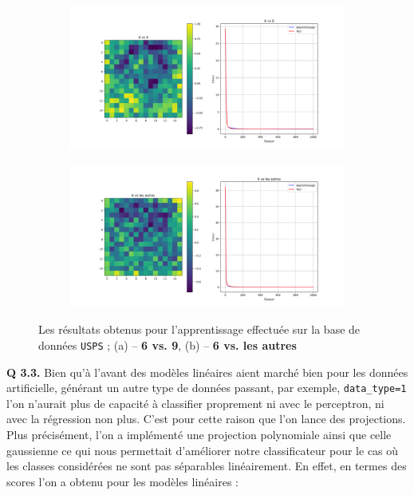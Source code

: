 \documentclass[a4paper,11pt]{article}
\theoremstyle{plain}
\theoremstyle{definition}
\begin{document}
\begin{figure}
    \centering
    \begin{subfigure}{1.0\textwidth}
    	\centering
    	\includegraphics{Figures/Figure_7.png}
    	\caption{}
    	\label{ResUSPS6vs9}
    \end{subfigure}

    \begin{subfigure}{1.0\textwidth}
    	\centering
    	\includegraphics{Figures/Figure_8.png}
    	\caption{}
    	\label{ResUSPS6vsOther}
    \end{subfigure}
    \caption{Les résultats obtenus pour l'apprentissage effectuée sur la base de données \texttt{USPS} ; (a) -- \textbf{6 vs. 9}, (b) -- \textbf{6 vs. les autres}}
    \label{ResUSPS}
\end{figure}

\textbf{Q 3.3.} Bien qu'à l'avant des modèles linéaires aient marché bien pour les données artificielle, générant un autre type de données passant, par exemple, \texttt{data\_type=1} l'on n'aurait plus de capacité à classifier proprement ni avec le perceptron, ni avec la régression non plus. C'est pour cette raison que l'on lance des projections. Plus précisément, l'on a implémenté une projection polynomiale ainsi que celle gaussienne ce qui nous permettait d'améliorer notre classificateur pour le cas où les classes considérées ne sont pas séparables linéairement. En effet, en termes des scores l'on a obtenu pour les modèles linéaires :
\end{document}
